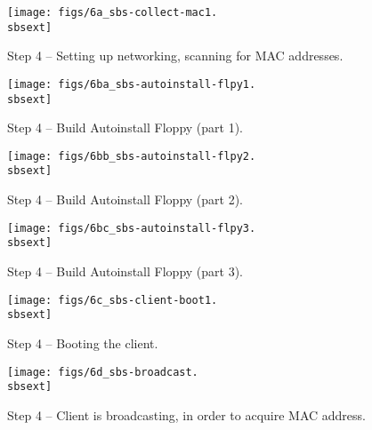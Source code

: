 \begin{figure}[htbp]
  \begin{center}
    \texttt{[image: figs/6a\_sbs-collect-mac1.\\sbsext]}
    \caption{Step 4 -- Setting up networking, scanning for MAC addresses.}
    \label{fig:sbs-setup-network1}
  \end{center}
\end{figure}

\begin{figure}[htbp]
  \begin{center}
    \texttt{[image: figs/6ba\_sbs-autoinstall-flpy1.\\sbsext]}
    \caption{Step 4 -- Build Autoinstall Floppy (part 1).}
    \label{fig:sbs-autoinstall-flpy1}
  \end{center}
\end{figure}

\begin{figure}[htbp]
  \begin{center}
    \texttt{[image: figs/6bb\_sbs-autoinstall-flpy2.\\sbsext]}
    \caption{Step 4 -- Build Autoinstall Floppy (part 2).}
    \label{fig:sbs-autoinstall-flpy1}
  \end{center}
\end{figure}

\begin{figure}[htbp]
  \begin{center}
    \texttt{[image: figs/6bc\_sbs-autoinstall-flpy3.\\sbsext]}
    \caption{Step 4 -- Build Autoinstall Floppy (part 3).}
    \label{fig:sbs-autoinstall-flpy3}
  \end{center}
\end{figure}

\begin{figure}[htbp]
  \begin{center}
    \texttt{[image: figs/6c\_sbs-client-boot1.\\sbsext]}
    \caption{Step 4 -- Booting the client.}
    \label{fig:sbs-collect-boot}
  \end{center}
\end{figure}

\begin{figure}[htbp]
  \begin{center}
    \texttt{[image: figs/6d\_sbs-broadcast.\\sbsext]}
    \caption{Step 4 -- Client is broadcasting, in order to acquire MAC address.}
    \label{fig:sbs-collect-broadcast}
  \end{center}
\end{figure}

